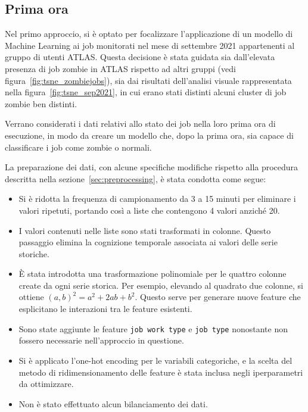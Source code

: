 \subsection{Prima ora}

Nel primo approccio, si è optato per focalizzare l'applicazione di un modello
di Machine Learning ai job monitorati nel mese di settembre 2021 appartenenti
al gruppo di utenti ATLAS. Questa decisione è stata guidata sia dall'elevata
presenza di job zombie in ATLAS rispetto ad altri gruppi (vedi
figura~\ref{fig:tsne_zombiejobs}), sia dai risultati dell'analisi visuale
rappresentata nella figura~\ref{fig:tsne_sep2021}, in cui erano stati distinti
alcuni cluster di job zombie ben distinti. 

Verrano considerati i dati relativi allo stato dei job nella loro prima ora di
esecuzione, in modo da creare un modello che, dopo la prima ora, sia capace di
classificare i job come zombie o normali. 

La preparazione dei dati, con alcune specifiche modifiche rispetto alla
procedura descritta nella sezione~\ref{sec:preprocessing}, è stata condotta
come segue:

\begin{itemize}
    \item Si è ridotta la frequenza di campionamento da 3 a 15 minuti per
        eliminare i valori ripetuti, portando così a liste che contengono 4
        valori anziché 20.
    \item I valori contenuti nelle liste sono stati trasformati in colonne.
        Questo passaggio elimina la cognizione temporale associata ai valori
        delle serie storiche.
    \item È stata introdotta una trasformazione polinomiale per le quattro
        colonne create da ogni serie storica. Per esempio, elevando al
        quadrato due colonne, si ottiene $(a,b)^2=a^2+2ab+b^2$. Questo serve
        per generare nuove feature che esplicitano le interazioni tra le
        feature esistenti.
    \item Sono state aggiunte le feature \verb|job work type| e \verb|job type| 
        nonostante non fossero necessarie nell'approccio in questione.
    \item Si è applicato l'one-hot encoding per le variabili categoriche, e la
        scelta del metodo di ridimensionamento delle feature è stata inclusa
        negli iperparametri da ottimizzare.
    \item Non è stato effettuato alcun bilanciamento dei dati.
\end{itemize}

